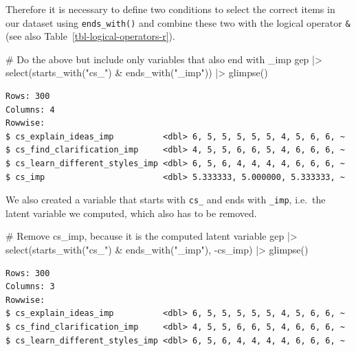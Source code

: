 \documentclass[
  letterpaper,
  DIV=11,
  numbers=noendperiod]{scrreprt}
\newenvironment{Shaded}{\begin{snugshade}}{\end{snugshade}}
\newcommand{\CommentTok}[1]{\textcolor[rgb]{0.37,0.37,0.37}{#1}}
\newcommand{\FunctionTok}[1]{\textcolor[rgb]{0.28,0.35,0.67}{#1}}
\newcommand{\NormalTok}[1]{\textcolor[rgb]{0.00,0.23,0.31}{#1}}
\newcommand{\SpecialCharTok}[1]{\textcolor[rgb]{0.37,0.37,0.37}{#1}}
\newcommand{\StringTok}[1]{\textcolor[rgb]{0.13,0.47,0.30}{#1}}
\begin{document}
Therefore it is necessary to define two conditions to select the correct
items in our dataset using \texttt{ends\_with()} and combine these two
with the logical operator \texttt{\&} (see also
Table~\ref{tbl-logical-operators-r}).

\begin{Shaded}
\begin{Highlighting}[]
\CommentTok{\# Do the above but include only variables that also end with \textquotesingle{}\_imp\textquotesingle{}}
\NormalTok{gep }\SpecialCharTok{|\textgreater{}}
  \FunctionTok{select}\NormalTok{(}\FunctionTok{starts\_with}\NormalTok{(}\StringTok{"cs\_"}\NormalTok{) }\SpecialCharTok{\&} \FunctionTok{ends\_with}\NormalTok{(}\StringTok{"\_imp"}\NormalTok{)) }\SpecialCharTok{|\textgreater{}}
  \FunctionTok{glimpse}\NormalTok{()}
\end{Highlighting}
\end{Shaded}

\begin{verbatim}
Rows: 300
Columns: 4
Rowwise: 
$ cs_explain_ideas_imp          <dbl> 6, 5, 5, 5, 5, 5, 4, 5, 6, 6, ~
$ cs_find_clarification_imp     <dbl> 4, 5, 5, 6, 6, 5, 4, 6, 6, 6, ~
$ cs_learn_different_styles_imp <dbl> 6, 5, 6, 4, 4, 4, 4, 6, 6, 6, ~
$ cs_imp                        <dbl> 5.333333, 5.000000, 5.333333, ~
\end{verbatim}

We also created a variable that starts with \texttt{cs\_} and ends with
\texttt{\_imp}, i.e.~the latent variable we computed, which also has to
be removed.

\begin{Shaded}
\begin{Highlighting}[]
\CommentTok{\# Remove \textquotesingle{}cs\_imp\textquotesingle{}, because it is the computed latent variable}
\NormalTok{gep }\SpecialCharTok{|\textgreater{}}
  \FunctionTok{select}\NormalTok{(}\FunctionTok{starts\_with}\NormalTok{(}\StringTok{"cs\_"}\NormalTok{) }\SpecialCharTok{\&} \FunctionTok{ends\_with}\NormalTok{(}\StringTok{"\_imp"}\NormalTok{), }\SpecialCharTok{{-}}\NormalTok{cs\_imp) }\SpecialCharTok{|\textgreater{}}
  \FunctionTok{glimpse}\NormalTok{()}
\end{Highlighting}
\end{Shaded}

\begin{verbatim}
Rows: 300
Columns: 3
Rowwise: 
$ cs_explain_ideas_imp          <dbl> 6, 5, 5, 5, 5, 5, 4, 5, 6, 6, ~
$ cs_find_clarification_imp     <dbl> 4, 5, 5, 6, 6, 5, 4, 6, 6, 6, ~
$ cs_learn_different_styles_imp <dbl> 6, 5, 6, 4, 4, 4, 4, 6, 6, 6, ~
\end{verbatim}
\end{document}
